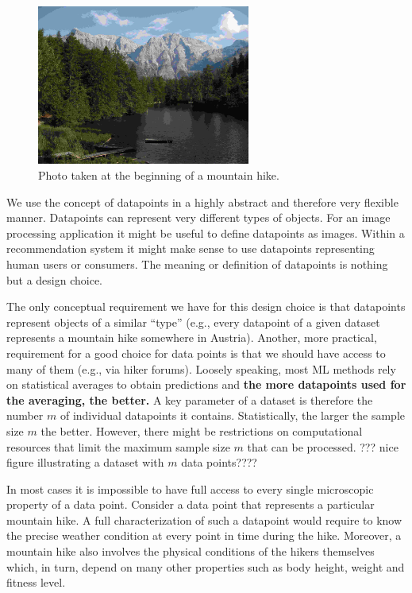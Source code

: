 \documentclass[12pt]{report}
\begin{document}
\begin{figure}[htbp]
	\centering
	\includegraphics[width=7cm]{BergSee1.jpg}
	\caption{Photo taken at the beginning of a mountain hike.}
	\label{fig:image}
\end{figure}


We use the concept of datapoints in a highly abstract and therefore very flexible 
manner. Datapoints can represent very different types of objects. For an image 
processing application it might be useful to define datapoints as images. Within 
a recommendation system it might make sense to use datapoints representing 
human users or consumers. The meaning or definition of datapoints is nothing 
but a design choice. 

The only conceptual requirement we have for this design choice is that datapoints 
represent objects of a similar ``type'' (e.g., every datapoint of a given dataset 
represents a mountain hike somewhere in Austria). Another, more practical, requirement 
for a good choice for data points is that we should have access to many of them 
(e.g., via hiker forums). Loosely speaking, most ML methods rely on statistical 
averages to obtain predictions and {\bf the more datapoints used for the averaging, the better.} 
A key parameter of a dataset is therefore the number $m$ of individual datapoints 
it contains. Statistically, the larger the sample size $m$ the better. However, there 
might be restrictions on computational resources that limit the maximum sample size 
$m$ that can be processed. ??? nice figure illustrating a dataset with $m$ data points????

In most cases it is impossible to have full access to every single microscopic property 
of a data point. Consider a data point that represents a particular mountain hike. A 
full characterization of such a datapoint would require to know the precise weather 
condition at every point in time during the hike. Moreover, a mountain hike also 
involves the physical conditions of the hikers themselves which, in turn, depend 
on many other properties such as body height, weight and fitness level. 
\end{document}
